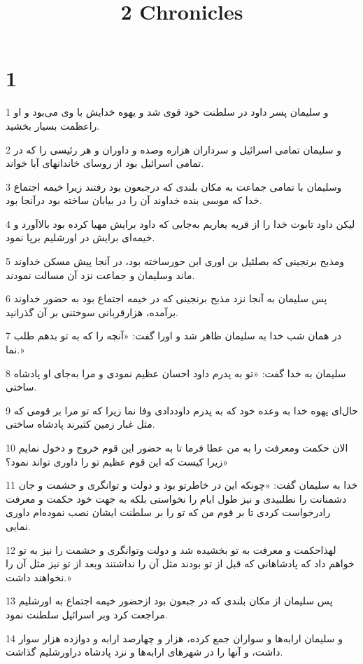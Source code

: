

\title{2 Chronicles}

 
\chapter{1}

\par 1 و سلیمان پسر داود در سلطنت خود قوی شد و یهوه خدایش با وی می‌بود و او راعظمت بسیار بخشید.
\par 2 و سلیمان تمامی اسرائیل و سرداران هزاره وصده و داوران و هر رئیسی را که در تمامی اسرائیل بود از روسای خاندانهای آبا خواند.
\par 3 وسلیمان با تمامی جماعت به مکان بلندی که درجبعون بود رفتند زیرا خیمه اجتماع خدا که موسی بنده خداوند آن را در بیابان ساخته بود درآنجا بود.
\par 4 لیکن داود تابوت خدا را از قریه یعاریم به‌جایی که داود برایش مهیا کرده بود بالاآورد و خیمه‌ای برایش در اورشلیم برپا نمود.
\par 5 ومذبح برنجینی که بصلئیل بن اوری ابن حورساخته بود، در آنجا پیش مسکن خداوند ماند وسلیمان و جماعت نزد آن مسالت نمودند.
\par 6 پس سلیمان به آنجا نزد مذبح برنجینی که در خیمه اجتماع بود به حضور خداوند برآمده، هزارقربانی سوختنی بر آن گذرانید.
\par 7 در همان شب خدا به سلیمان ظاهر شد و اورا گفت: «آنچه را که به تو بدهم طلب نما.»
\par 8 سلیمان به خدا گفت: «تو به پدرم داود احسان عظیم نمودی و مرا به‌جای او پادشاه ساختی.
\par 9 حال‌ای یهوه خدا به وعده خود که به پدرم داوددادی وفا نما زیرا که تو مرا بر قومی که مثل غبار زمین کثیرند پادشاه ساختی.
\par 10 الان حکمت ومعرفت را به من عطا فرما تا به حضور این قوم خروج و دخول نمایم زیرا کیست که این قوم عظیم تو را داوری تواند نمود؟»
\par 11 خدا به سلیمان گفت: «چونکه این در خاطرتو بود و دولت و توانگری و حشمت و جان دشمنانت را نطلبیدی و نیز طول ایام را نخواستی بلکه به جهت خود حکمت و معرفت رادرخواست کردی تا بر قوم من که تو را بر سلطنت ایشان نصب نموده‌ام داوری نمایی.
\par 12 لهذاحکمت و معرفت به تو بخشیده شد و دولت وتوانگری و حشمت را نیز به تو خواهم داد که پادشاهانی که قبل از تو بودند مثل آن را نداشتند وبعد از تو نیز مثل آن را نخواهند داشت.»
\par 13 پس سلیمان از مکان بلندی که در جبعون بود ازحضور خیمه اجتماع به اورشلیم مراجعت کرد وبر اسرائیل سلطنت نمود.
\par 14 و سلیمان ارابه‌ها و سواران جمع کرده، هزار و چهارصد ارابه و دوازده هزار سوار داشت، و آنها را در شهرهای ارابه‌ها و نزد پادشاه دراورشلیم گذاشت.
